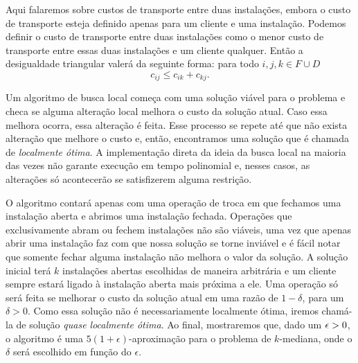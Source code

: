 Aqui falaremos sobre custos de transporte entre duas instalações, embora o custo de transporte esteja definido apenas para um cliente e uma instalação.
Podemos definir o custo de transporte entre duas instalações como o menor custo de transporte entre essas duas instalações e um cliente qualquer. Então a desigualdade triangular valerá da seguinte forma: para todo $i,j,k \in F \cup D$ 
\[ c_{ij} \leq c_{ik} + c_{kj}.\]

Um algoritmo de busca local começa com uma solução viável para o problema e checa se alguma alteração local melhora o custo da solução atual. Caso essa melhora ocorra, essa alteração é feita. Esse processo se repete até que não exista alteração que melhore o custo e, então, encontramos uma solução que é chamada de \emph{localmente ótima}. A implementação direta da ideia da busca local na maioria das vezes não garante execução em tempo polinomial e, nesses casos, as alterações só acontecerão se satisfizerem alguma restrição. 

O algoritmo contará apenas com uma operação de troca em que fechamos uma instalação aberta e abrimos uma instalação fechada. Operações que exclusivamente abram ou fechem instalações não são viáveis, uma vez que apenas abrir uma instalação faz com que nossa solução se torne inviável e é fácil notar que somente fechar alguma instalação não melhora o valor da solução. A solução inicial terá  $k$ instalações abertas escolhidas de maneira arbitrária e um cliente sempre estará ligado à instalação aberta mais próxima a ele. Uma operação só será feita se melhorar o custo da solução atual em uma razão de $1-\delta$, para um $\delta>0$. Como essa solução não é necessariamente localmente ótima, iremos chamá-la de solução \emph{quase localmente ótima}. Ao final, mostraremos que, dado um $\epsilon > 0$, o algoritmo é uma $5(1 + \epsilon)$-aproximação para o problema de $k$-mediana, onde o $\delta$ será escolhido em função do $\epsilon$.

